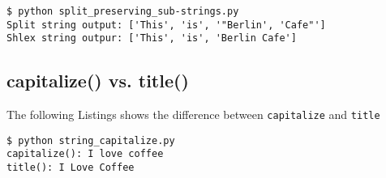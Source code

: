 

\begin{lstlisting}[caption=Output of split\_preserving\_sub-strings.py]
$ python split_preserving_sub-strings.py
Split string output: ['This', 'is', '"Berlin', 'Cafe"']
Shlex string outpur: ['This', 'is', 'Berlin Cafe']
\end{lstlisting}


\subsection{capitalize() vs. title()}

The following Listings shows the difference between \lstinline{capitalize} and \lstinline{title}



\begin{lstlisting}[caption=Output of string\_capitalize.py]
$ python string_capitalize.py
capitalize(): I love coffee
title(): I Love Coffee
\end{lstlisting}
